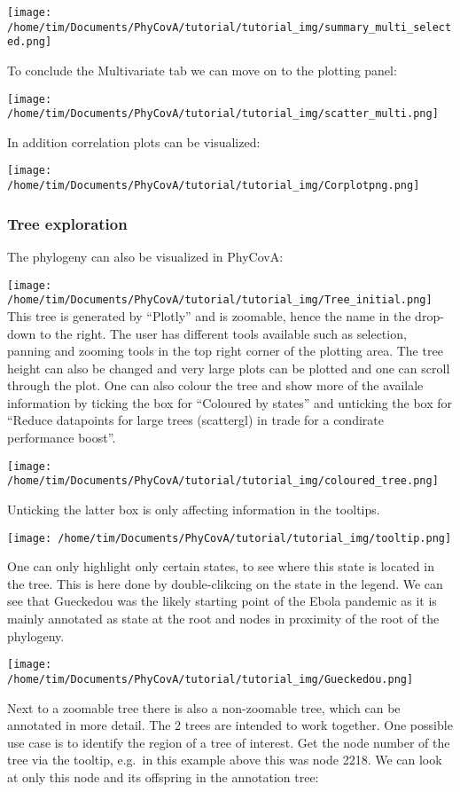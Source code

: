 \documentclass[
]{article}
\begin{document}
\texttt{[image: /home/tim/Documents/PhyCovA/tutorial/tutorial\_img/summary\_multi\_selected.png]}

To conclude the Multivariate tab we can move on to the plotting panel:

\texttt{[image: /home/tim/Documents/PhyCovA/tutorial/tutorial\_img/scatter\_multi.png]}

In addition correlation plots can be visualized:

\texttt{[image: /home/tim/Documents/PhyCovA/tutorial/tutorial\_img/Corplotpng.png]}

\hypertarget{tree-exploration}{%
\subsubsection{Tree exploration}\label{tree-exploration}}

The phylogeny can also be visualized in PhyCovA:

\texttt{[image: /home/tim/Documents/PhyCovA/tutorial/tutorial\_img/Tree\_initial.png]}
This tree is generated by ``Plotly'' and is zoomable, hence the name in
the drop-down to the right. The user has different tools available such
as selection, panning and zooming tools in the top right corner of the
plotting area. The tree height can also be changed and very large plots
can be plotted and one can scroll through the plot. One can also colour
the tree and show more of the availale information by ticking the box
for ``Coloured by states'' and unticking the box for ``Reduce datapoints
for large trees (scattergl) in trade for a condirate performance
boost''.

\texttt{[image: /home/tim/Documents/PhyCovA/tutorial/tutorial\_img/coloured\_tree.png]}

Unticking the latter box is only affecting information in the tooltips.

\texttt{[image: /home/tim/Documents/PhyCovA/tutorial/tutorial\_img/tooltip.png]}

One can only highlight only certain states, to see where this state is
located in the tree. This is here done by double-clikcing on the state
in the legend. We can see that Gueckedou was the likely starting point
of the Ebola pandemic as it is mainly annotated as state at the root and
nodes in proximity of the root of the phylogeny.

\texttt{[image: /home/tim/Documents/PhyCovA/tutorial/tutorial\_img/Gueckedou.png]}

Next to a zoomable tree there is also a non-zoomable tree, which can be
annotated in more detail. The 2 trees are intended to work together. One
possible use case is to identify the region of a tree of interest. Get
the node number of the tree via the tooltip, e.g.~in this example above
this was node 2218. We can look at only this node and its offspring in
the annotation tree:
\end{document}

